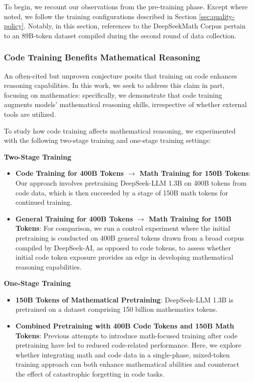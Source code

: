 \begin{itemize}[topsep=0pt]
\begin{itemize}[topsep=0pt]
To begin, we recount our observations from the pre-training phase. Except where noted, we follow the training configurations described in Section \ref{sec:quality-policy}. Notably, in this section, references to the DeepSeekMath Corpus pertain to an 89B-token dataset compiled during the second round of data collection.

\subsubsection{Code Training Benefits Mathematical Reasoning}

An often-cited but unproven conjecture posits that training on code enhances reasoning capabilities. In this work, we seek to address this claim in part, focusing on mathematics: specifically, we demonstrate that code training augments models’ mathematical reasoning skills, irrespective of whether external tools are utilized.

To study how code training affects mathematical reasoning, we experimented with the following two-stage training and one-stage training settings:

\textbf{Two-Stage Training}

\begin{itemize}[topsep=0pt]
    \item \textbf{Code Training for 400B Tokens $\rightarrow$ Math Training for 150B Tokens}: Our approach involves pretraining DeepSeek-LLM 1.3B on 400B tokens from code data, which is then succeeded by a stage of 150B math tokens for continued training.
    \item \textbf{General Training for 400B Tokens $\rightarrow$ Math Training for 150B Tokens}: For comparison, we run a control experiment where the initial pretraining is conducted on 400B general tokens drawn from a broad corpus compiled by DeepSeek-AI, as opposed to code tokens, to assess whether initial code token exposure provides an edge in developing mathematical reasoning capabilities.
\end{itemize}

\textbf{One-Stage Training}

\begin{itemize}[topsep=0pt]
    \item \textbf{150B Tokens of Mathematical Pretraining}: DeepSeek-LLM 1.3B is pretrained on a dataset comprising 150 billion mathematics tokens.
    \item \textbf{Combined Pretraining with 400B Code Tokens and 150B Math Tokens}: Previous attempts to introduce math-focused training after code pretraining have led to reduced code-related performance. Here, we explore whether integrating math and code data in a single-phase, mixed-token training approach can both enhance mathematical abilities and counteract the effect of catastrophic forgetting in code tasks.
\end{itemize}


\end{itemize}
\end{itemize}
